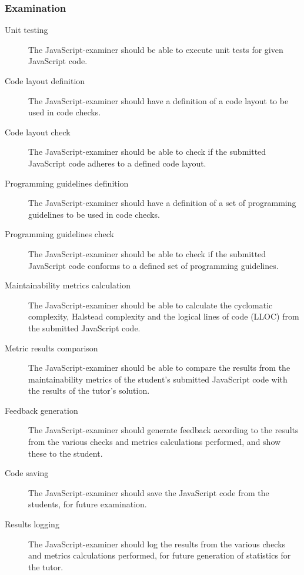 \subsubsection{Examination}
\begin{description}
  \item[Unit testing] The JavaScript-examiner should be able to execute unit 
    tests for given JavaScript code.
  \item[Code layout definition] The JavaScript-examiner should have a
    definition of a code layout to be used in code checks.
  \item[Code layout check] The JavaScript-examiner should be able to check if 
    the submitted JavaScript code adheres to a defined code layout.
  \item[Programming guidelines definition] The JavaScript-examiner should have
    a definition of a set of programming guidelines to be used in code checks.
  \item[Programming guidelines check] The JavaScript-examiner should be able to
    check if the submitted JavaScript code conforms to a defined set of
    programming guidelines.
  \item[Maintainability metrics calculation] The JavaScript-examiner should be 
    able to calculate the cyclomatic complexity, Halstead complexity and the 
    logical lines of code (LLOC) from the submitted JavaScript code.
  \item[Metric results comparison] The JavaScript-examiner should be able to
    compare the results from the maintainability metrics of the student's
    submitted JavaScript code with the results of the tutor's solution.
  \item[Feedback generation] The JavaScript-examiner should generate feedback
    according to the results from the various checks and metrics calculations
    performed, and show these to the student.
  \item[Code saving] The JavaScript-examiner should save the JavaScript code
    from the students, for future examination.
  \item[Results logging] The JavaScript-examiner should log the results from
    the various checks and metrics calculations performed, for future
    generation of statistics for the tutor.
\end{description}

